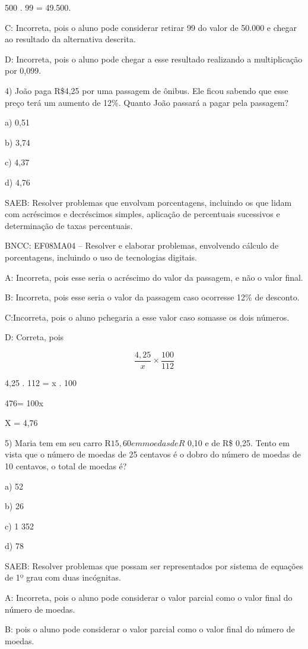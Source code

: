 500 . 99 = 49.500.

C: Incorreta, pois o aluno pode considerar retirar 99 do valor de 50.000
e chegar ao resultado da alternativa descrita.

D: Incorreta, pois o aluno pode chegar a esse resultado realizando a
multiplicação por 0,099.

4) João paga R\$4,25 por uma passagem de ônibus. Ele ficou sabendo que
esse preço terá um aumento de 12\%. Quanto João passará a pagar pela
passagem?

a) 0,51

b) 3,74

c) 4,37

d) 4,76

SAEB: Resolver problemas que envolvam porcentagens, incluindo os que
lidam com acréscimos e decréscimos simples, aplicação de percentuais
sucessivos e determinação de taxas percentuais.

BNCC: EF08MA04 -- Resolver e elaborar problemas, envolvendo cálculo de
porcentagens, incluindo o uso de tecnologias digitais.

A: Incorreta, pois esse seria o acréscimo do valor da passagem, e não o
valor final.

B: Incorreta, pois esse seria o valor da passagem caso ocorresse 12\% de
desconto.

C:Incorreta, pois o aluno pchegaria a esse valor caso somasse os dois
números.

D: Correta, pois

\[\frac {4,25}{x} \times \frac {100}{112}\]

4,25 . 112 = x . 100

476= 100x

X = 4,76

5) Maria tem em seu carro R\(15,60 em moedas de R\) 0,10 e de R\$ 0,25.
Tento em vista que o número de moedas de 25 centavos é o dobro do número
de moedas de 10 centavos, o total de moedas é?

a) 52

b) 26

c) 1 352

d) 78

SAEB: Resolver problemas que possam ser representados por sistema de
equações de 1º grau com duas incógnitas.

A: Incorreta, pois o aluno pode considerar o valor parcial como o valor
final do número de moedas.

B: pois o aluno pode considerar o valor parcial como o valor final do
número de moedas.

